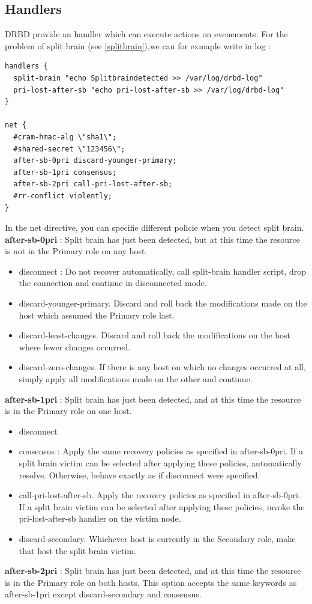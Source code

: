 \documentclass[a4paper,10pt]{report}
\begin{document}
\subsection{Handlers}
DRBD provide an handler which can execute actions on evenements. For the problem of split brain (see \ref{splitbrain}),we can for exmaple write in log :
\begin{lstlisting}
handlers {
  split-brain "echo Splitbraindetected >> /var/log/drbd-log"
  pri-lost-after-sb "echo pri-lost-after-sb >> /var/log/drbd-log"
}

net {
  #cram-hmac-alg \"sha1\";
  #shared-secret \"123456\";
  after-sb-0pri discard-younger-primary;
  after-sb-1pri consensus;
  after-sb-2pri call-pri-lost-after-sb;
  #rr-conflict violently;
}
\end{lstlisting}
In the net directive, you can specifie different policie when you detect split brain.\\
\textbf{after-sb-0pri} : Split brain has just been detected, but at this time the resource is not in the Primary role on any host.
\begin{itemize}
\item disconnect : Do not recover automatically, call split-brain handler script, drop the connection and continue in disconnected mode.
\item discard-younger-primary. Discard and roll back the modifications made on the host which assumed the Primary role last.
\item discard-least-changes. Discard and roll back the modifications on the host where fewer changes occurred.
\item discard-zero-changes. If there is any host on which no changes occurred at all, simply apply all modifications made on the other and continue.
\end{itemize}
\textbf{after-sb-1pri} : Split brain has just been detected, and at this time the resource is in the Primary role on one host.
\begin{itemize}
\item disconnect 
\item consensus : Apply the same recovery policies as specified in after-sb-0pri. If a split brain victim can be selected after applying these policies, automatically resolve. Otherwise, behave exactly as if disconnect were specified.
\item call-pri-lost-after-sb. Apply the recovery policies as specified in after-sb-0pri. If a split brain victim can be selected after applying these policies, invoke the pri-lost-after-sb handler on the victim node.
\item discard-secondary. Whichever host is currently in the Secondary role, make that host the split brain victim.
\end{itemize}
\textbf{after-sb-2pri} : Split brain has just been detected, and at this time the resource is in the Primary role on both hosts. This option accepts the same keywords as after-sb-1pri except discard-secondary and consensus.
\end{document}
